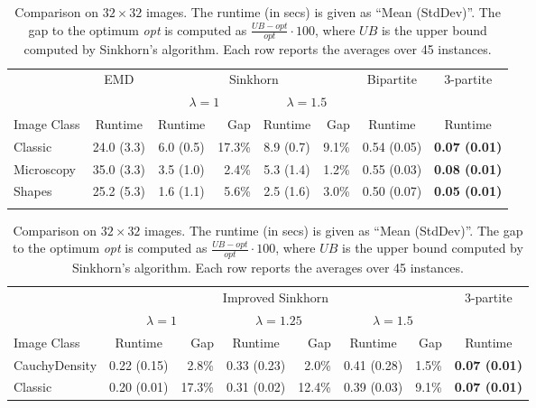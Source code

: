 \documentclass[al, 27pt, plainboxedsections, landscape]{sciposter}
\begin{document}
\begin{multicols}{3}
\begin{table}[t!]
\caption{Comparison on $32 \times 32$ images. The runtime (in secs) is given as ``Mean (StdDev)''.
The gap to the optimum {\it opt} is computed as $\frac{UB-opt}{opt}\cdot 100$, where $UB$ is the upper bound computed by Sinkhorn's algorithm.
Each row reports the averages over 45 instances.
\label{tab:1}}
\centering
{\renewcommand{\arraystretch}{1.2}
\begin{tabular}{l|c|@{\hskip 0.3in}cr|@{\hskip 0.3in}cr|@{\hskip 0.3in}c|@{\hskip 0.3in}c}
      \multicolumn{1}{c}{}& \multicolumn{1}{c}{EMD\cite{Rubner98}} &  \multicolumn{4}{c}{Sinkhorn \cite{Cuturi2013}} & \multicolumn{1}{c}{Bipartite} & \multicolumn{1}{c}{$3$-partite} \\
	  \multicolumn{1}{c}{}& \multicolumn{1}{c}{}& \multicolumn{2}{c}{$\lambda=1$} & \multicolumn{2}{c}{$\lambda=1.5$} &  \multicolumn{1}{c}{}&  \\
	  \hline
Image Class & Runtime & Runtime & Gap & Runtime & Gap & Runtime & Runtime \\
\hline
Classic    & 24.0 (3.3) & 6.0 (0.5) & 17.3\% & 8.9 (0.7) & 9.1\%  & 0.54 (0.05) & {\bf 0.07 (0.01)}\\
Microscopy & 35.0 (3.3) & 3.5 (1.0) &  2.4\% & 5.3 (1.4) & 1.2\% & 0.55 (0.03) & {\bf 0.08 (0.01)}\\
Shapes     & 25.2 (5.3) & 1.6 (1.1) &  5.6\% & 2.5 (1.6) & 3.0\% & 0.50 (0.07) & {\bf 0.05 (0.01)}\\
 \hline\noalign{\smallskip}
 \multicolumn{8}{c}{} \\
 \end{tabular}}
\centering
{\renewcommand{\arraystretch}{1.2}
\setlength{\tabcolsep}{5pt}
\begin{tabular}{l|cr|@{\hskip 0.2in}cr|@{\hskip 0.2in}cr|@{\hskip 0.2in}c}
  \multicolumn{1}{c}{}    & \multicolumn{6}{c}{Improved Sinkhorn \cite{Solomon2015}} & \multicolumn{1}{c}{$3$-partite} \\
	\multicolumn{1}{c}{}  & \multicolumn{2}{c}{$\lambda=1$} & \multicolumn{2}{c}{$\lambda=1.25$}  & \multicolumn{2}{c}{$\lambda=1.5$}  &  \\
\hline
Image Class     & Runtime           & Gap       & Runtime           & Gap       & Runtime           & Gap       &   Runtime \\
\hline
 CauchyDensity	&	0.22	(0.15)	&	2.8\%	&	0.33	(0.23)	&	2.0\%	&	0.41	(0.28)	&	1.5\%	&	{\bf 0.07	(0.01)}	\\
 Classic		&	0.20	(0.01)	&	17.3\%	&	0.31	(0.02)	&	12.4\%	&	0.39	(0.03)	&	9.1\%	&	{\bf 0.07	(0.01)}	\\

\end{tabular}}
\end{table}
\end{multicols}
\end{document}
